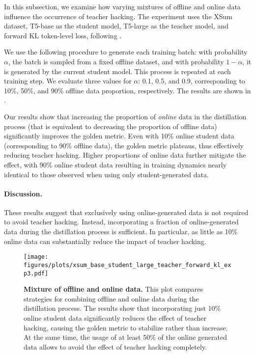 In this subsection, we examine how varying mixtures of offline and online data influence the occurrence of teacher hacking. The experiment uses the XSum dataset, T5-base as the student model, T5-large as the teacher model, and forward KL token-level loss, following .

We use the following procedure to generate each training batch: with probability $\alpha$, the batch is sampled from a fixed offline dataset, and with probability $1-\alpha$, it is generated by the current student model. This process is repeated at each training step. We evaluate three values for $\alpha$: 0.1, 0.5, and 0.9, corresponding to 10\%, 50\%, and 90\%  offline data proportion, respectively. The results are shown in .

Our results show that increasing the proportion of \textit{online} data in the distillation process (that is equivalent to decreasing the proportion of offline data) significantly improves the golden metric. Even with 10\% online student data (corresponding to 90\% offline data), the golden metric plateaus, thus effectively reducing teacher hacking. Higher proportions of online data further mitigate the effect, with 90\% online student data resulting in training dynamics nearly identical to those observed when using only student-generated data.

\paragraph{Discussion.} These results suggest that exclusively using online-generated data is not required to avoid teacher hacking. Instead, incorporating a fraction of online-generated data during the distillation process is sufficient. In particular, as little as 10\% online data can substantially reduce the impact of teacher hacking.



\begin{figure}[ht]
    \centering
    \texttt{[image: figures/plots/xsum\_base\_student\_large\_teacher\_forward\_kl\_exp3.pdf]}
    \caption{\textbf{Mixture of offline and online data.} 
    This plot compares strategies for combining offline and online data during the distillation process. The results show that incorporating just 10\% online student data significantly reduces the effect of teacher hacking, causing the golden metric to stabilize rather than increase.  At the same time, the usage of at least 50\% of the online generated data allows to avoid the effect of teacher hacking completely.
    }
    \label{fig:mixture_exp_large_to_base_online_fwd_kl}
\end{figure}